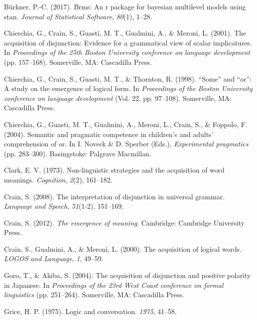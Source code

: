 \documentclass[,man,floatsintext]{apa6}
\begin{document}
\leavevmode\hypertarget{ref-burkner2017brms}{}%
Bürkner, P.-C. (2017). Brms: An r package for bayesian multilevel models using stan. \emph{Journal of Statistical Software}, \emph{80}(1), 1--28.

\leavevmode\hypertarget{ref-chierchia2001acquisition}{}%
Chierchia, G., Crain, S., Guasti, M. T., Gualmini, A., \& Meroni, L. (2001). The acquisition of disjunction: Evidence for a grammatical view of scalar implicatures. In \emph{Proceedings of the 25th Boston University conference on language development} (pp. 157--168). Somerville, MA: Cascadilla Press.

\leavevmode\hypertarget{ref-chierchia1998some}{}%
Chierchia, G., Crain, S., Guasti, M. T., \& Thornton, R. (1998). ``Some'' and ``or'': A study on the emergence of logical form. In \emph{Proceedings of the Boston University conference on language development} (Vol. 22, pp. 97--108). Somerville, MA: Cascadilla Press.

\leavevmode\hypertarget{ref-chierchia2004semantic}{}%
Chierchia, G., Guasti, M. T., Gualmini, A., Meroni, L., Crain, S., \& Foppolo, F. (2004). Semantic and pragmatic competence in children's and adults' comprehension of or. In I. Noveck \& D. Sperber (Eds.), \emph{Experimental pragmatics} (pp. 283--300). Basingstoke: Palgrave Macmillan.

\leavevmode\hypertarget{ref-clark1973non}{}%
Clark, E. V. (1973). Non-linguistic strategies and the acquisition of word meanings. \emph{Cognition}, \emph{2}(2), 161--182.

\leavevmode\hypertarget{ref-crain2008interpretation}{}%
Crain, S. (2008). The interpretation of disjunction in universal grammar. \emph{Language and Speech}, \emph{51}(1-2), 151--169.

\leavevmode\hypertarget{ref-crain2012emergence}{}%
Crain, S. (2012). \emph{The emergence of meaning}. Cambridge: Cambridge University Press.

\leavevmode\hypertarget{ref-crain2000acquisition}{}%
Crain, S., Gualmini, A., \& Meroni, L. (2000). The acquisition of logical words. \emph{LOGOS and Language}, \emph{1}, 49--59.

\leavevmode\hypertarget{ref-goro2004acquisition}{}%
Goro, T., \& Akiba, S. (2004). The acquisition of disjunction and positive polarity in Japanese. In \emph{Proceedings of the 23rd West Coast conference on formal linguistics} (pp. 251--264). Somerville, MA: Cascadilla Press.

\leavevmode\hypertarget{ref-grice1975logic}{}%
Grice, H. P. (1975). Logic and conversation. \emph{1975}, 41--58.
\end{document}
